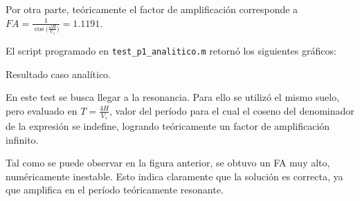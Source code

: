 Por otra parte, teóricamente el factor de amplificación corresponde a $FA=\frac{1}{\cos\bigg(\frac{\omega H}{V_s}\bigg)} = 1.1191$.

El script programado en \texttt{test\_p1\_analitico.m} retornó los siguientes gráficos:

\begin{images}{Resultado caso analítico.}
\end{images}

\newpage
{}

En este test se busca llegar a la resonancia. Para ello se utilizó el mismo suelo, pero evaluado en $T=\frac{4H}{V_s}$, valor del período para el cual el coseno del denominador de la expresión se indefine, logrando teóricamente un factor de amplificación infinito.


Tal como se puede observar en la figura anterior, se obtuvo un FA muy alto, numéricamente inestable. Esto indica claramente que la solución es correcta, ya que amplifica en el período teóricamente resonante.